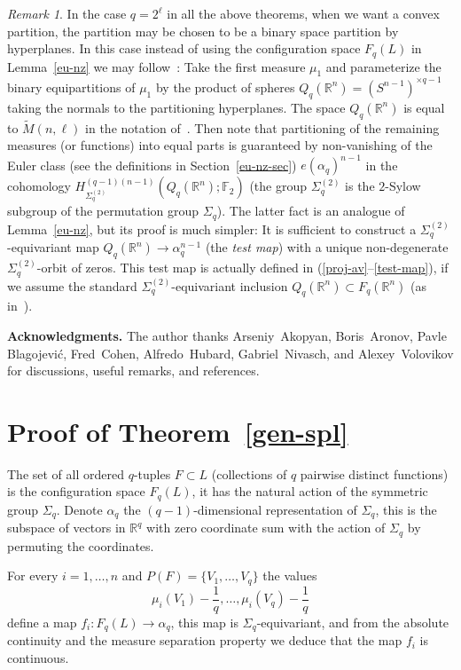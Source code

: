 \documentclass[12pt,a4paper,oneside]{amsart}
\theoremstyle{definition}
\theoremstyle{remark}
\newtheorem{rem}[thm]{Remark}
\numberwithin{equation}{section}
\newcommand{\Sg}{\Sigma}
\begin{document}
\begin{rem}
\label{pow2-rem}
In the case $q=2^\ell$ in all the above theorems, when we want a convex partition, the partition may be chosen to be a binary space partition by hyperplanes. In this case instead of using the configuration space $F_q(L)$ in Lemma~\ref{eu-nz} we may follow~\cite{mem2009}: Take the first measure $\mu_1$ and parameterize the binary equipartitions of $\mu_1$ by the product of spheres $Q_q(\mathbb R^n) = (S^{n-1})^{\times q-1}$ taking the normals to the partitioning  hyperplanes. The space $Q_q(\mathbb R^n)$ is equal to $\widetilde M(n, \ell)$ in the notation of~\cite[Definition~1.1]{hung1990}. Then note that partitioning of the remaining measures (or functions) into equal parts is guaranteed by non-vanishing of the Euler class (see the definitions in Section~\ref{eu-nz-sec}) $e(\alpha_q)^{n-1}$ in the cohomology $H_{\Sigma_q^{(2)}}^{(q-1)(n-1)} (Q_q(\mathbb R^n); \mathbb F_2)$ (the group $\Sigma_q^{(2)}$ is the $2$-Sylow subgroup of the permutation group $\Sigma_q$). The latter fact is an analogue of Lemma~\ref{eu-nz}, but its proof is much simpler: It is sufficient to construct a $\Sigma_q^{(2)}$-equivariant map $Q_q(\mathbb R^n)\to \alpha_q^{n-1}$ (the \emph{test map}) with a unique non-degenerate $\Sigma_q^{(2)}$-orbit of zeros. This test map is actually defined in (\ref{proj-av}--\ref{test-map}), if we assume the standard $\Sigma_q^{(2)}$-equivariant inclusion $Q_q(\mathbb R^n)\subset F_q(\mathbb R^n)$ (as in~\cite[Lemma~1.6]{hung1990}).
\end{rem}

{\bf Acknowledgments.}
The author thanks Arseniy~Akopyan, Boris~Aronov, Pavle Blagojevi\'c, Fred~Cohen, Alfredo~Hubard, Gabriel~Nivasch, and Alexey~Volovikov for discussions, useful remarks, and references.

\section{Proof of Theorem~\ref{gen-spl}}

The set of all ordered $q$-tuples $F\subset L$ (collections of $q$ pairwise distinct functions) is the configuration space $F_q(L)$, it has the natural action of the symmetric group $\Sg_q$. Denote $\alpha_q$ the $(q-1)$-dimensional representation of $\Sg_q$, this is the subspace of vectors in $\mathbb R^q$ with zero coordinate sum with the action of $\Sg_q$ by permuting the coordinates.

For every $i=1,\ldots, n$ and $P(F) = \{V_1,\ldots, V_q\}$ the values 
$$
\mu_i(V_1) - \frac{1}{q}, \ldots, \mu_i(V_q) - \frac{1}{q}
$$
define a map $f_i : F_q(L)\to \alpha_q$, this map is $\Sg_q$-equivariant, and from the absolute continuity and the measure separation property we deduce that the map $f_i$ is continuous. 
\end{document}
